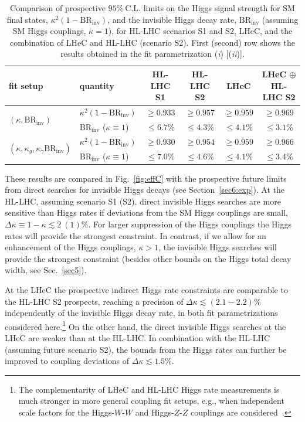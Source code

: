 \documentclass[../report.tex]{subfiles}
\newcommand{\BRHinv}{\mathrm{BR}_\mathrm{inv}}
\begin{document}
\begin{table}
\centering
\begin{tabular}{ l |  l | cccc}
\hline
fit setup &  quantity   & HL-LHC S1   & HL-LHC S2   & LHeC	  & LHeC $\oplus$ HL-LHC S2 \\
\hline
\multirow{2}{*}{$(\kappa, \mathrm{BR}_\text{inv})$} &  $\kappa^2 (1-\BRHinv)$ &  $\ge 0.933$ & $\ge 0.957$ & $\ge 0.959$  & $\ge 0.969$ \\
 									  &   $\BRHinv$ ($\kappa\equiv 1$) & $\le 6.7\%$ & $\le 4.3\% $ & $\le 4.1\%$ & $\le 3.1\%$\\
\hline									  
\multirow{2}{*}{$(\kappa, \kappa_g, \kappa_\gamma \mathrm{BR}_\text{inv})$} &  $\kappa^2 (1-\BRHinv)$ & $\ge0.930$ &  $\ge0.954$ & $\ge0.959$ & $\ge0.966$\\
 									  &   $\BRHinv$ ($\kappa\equiv 1$) & $\le7.0\%$ & $\le4.6\%$ & $\le4.1\%$ & $\le3.4\%$\\

\hline
\end{tabular}
\caption{{Comparison of prospective $95\%~\mathrm{C.L.}$ limits on the Higgs signal strength for SM final states, $\kappa^2(1-\mathrm{BR}_\text{inv})$, and the invisible Higgs decay rate, $\mathrm{BR}_\text{inv}$ (assuming SM Higgs couplings, $\kappa =1$), for HL-LHC scenarios S1 and S2, LHeC, and the combination of LHeC and HL-LHC (scenario S2). First (second) row shows the results obtained in the fit parametrization (\emph{i}) [(\emph{ii})].}}
\label{tab:effC_limits}
\end{table}


These results are compared in Fig.~\ref{fig:effC} with the prospective future limits from direct searches for invisible Higgs decays (see Section~\ref{sec6:exp}). At the HL-LHC, assuming scenario S1 (S2), direct invisible Higgs searches are more sensitive than Higgs rates if deviations from the SM Higgs couplings are small, $\Delta \kappa \equiv 1- \kappa \lesssim 2~(1)\%$. For larger suppression of the Higgs couplings the Higgs rates will provide the strongest constraint. In contrast, if we allow for an enhancement of the Higgs couplings, $\kappa > 1$, the invisible Higgs searches will provide the strongest constraint (besides other bounds on the Higgs total decay width, see Sec.~\ref{sec5}).



At the LHeC the prospective indirect Higgs rate constraints are comparable to the HL-LHC S2 prospects, reaching a precision of $\Delta \kappa \lesssim (2.1-2.2)\%$ independently of the invisible Higgs decay rate, in both fit parametrizations considered here.\footnote{The complementarity of LHeC and HL-LHC Higgs rate measurements is much stronger in more general coupling fit setups, e.g., when independent scale factors for the Higgs-$W$-$W$ and Higgs-$Z$-$Z$ couplings are considered~\cite{uta}.} On the other hand, the direct invisible Higgs searches at the LHeC are weaker than at the HL-LHC. In combination with the HL-LHC (assuming future scenario S2), the bounds from the Higgs rates can further be improved to coupling deviations of $\Delta \kappa \lesssim1.5\%$. 
\end{document}

